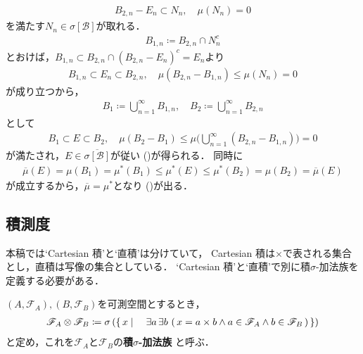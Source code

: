 \begin{prf}
\begin{description}
\begin{align}
						B_{2,n} - E_n \subset N_n, \quad \mu(N_n) = 0
					\end{align}
					を満たす$N_n \in \sigma[\mathcal{B}]$が取れる．
					\begin{align}
						B_{1,n} \coloneqq B_{2,n} \cap N_n^c
					\end{align}
					とおけば，$B_{1,n} \subset B_{2,n} \cap (B_{2,n} - E_n)^c = E_n$より
					\begin{align}
						B_{1,n} \subset E_n \subset B_{2,n},
						\quad \mu(B_{2,n} - B_{1,n}) \leq \mu(N_n) = 0
					\end{align}
					が成り立つから，
					\begin{align}
						B_1 \coloneqq \bigcup_{n=1}^\infty B_{1,n},
						\quad B_2 \coloneqq \bigcup_{n=1}^\infty B_{2,n}
					\end{align}
					として
					\begin{align}
						B_1 \subset E \subset B_2,
						\quad \mu(B_2 - B_1) \leq \mu\Biggl( \bigcup_{n=1}^\infty(B_{2,n} - B_{1,n}) \Biggr) = 0
					\end{align}
					が満たされ，$E \in \overline{\sigma[\mathcal{B}]}$が従い
					()が得られる．
					同時に
					\begin{align}
						\overline{\mu}(E) = \mu(B_1) = \mu^*(B_1)
						\leq \mu^*(E) \leq \mu^*(B_2) = \mu(B_2) = \overline{\mu}(E)
					\end{align}
					が成立するから，$\overline{\mu} = \mu^*$となり
					()が出る．
					\QED
			\end{description}
		\end{prf}
	
\subsection{積測度}
	本稿では`Cartesian 積'と`直積'は分けていて，
	Cartesian 積は$\times$で表される集合とし，直積は写像の集合としている．
	`Cartesian 積'と`直積'で別に積$\sigma$-加法族を定義する必要がある．
	\begin{screen}
		\begin{dfn}
			$(A,\mathscr{F}_A),(B,\mathscr{F}_B)$を可測空間とするとき，
			\begin{align}
				\mathscr{F}_A \otimes \mathscr{F}_B
				\coloneqq \sigma\left(\left\{\, x \mid \quad 
				\exists a\, \exists b\, 
				\left(\, x = a \times b \wedge a \in \mathscr{F}_A \wedge
				b \in \mathscr{F}_B\, \right)\, \right\} \right)
			\end{align}
			と定め，これを$\mathscr{F}_A$と$\mathscr{F}_B$の{\bf 積$\sigma$-加法族}
			と呼ぶ．
		\end{dfn}
	\end{screen}
	

